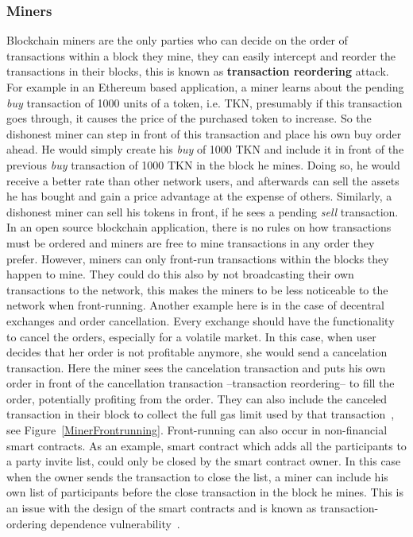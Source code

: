 \subsubsection{Miners}
Blockchain miners are the only parties who can decide on the order of transactions within a block they mine, they can easily intercept and reorder the transactions in their blocks, this is known as \textbf{transaction reordering} attack.  For example in an Ethereum based application, a miner learns about the pending \textit{buy} transaction of 1000 units of a token, i.e. TKN, presumably if this transaction goes through, it causes the price of the purchased token to increase. So the dishonest miner can step in front of this transaction and place his own buy order ahead. He would simply create his \textit{buy} of 1000 TKN and include it in front of the previous \textit{buy} transaction of 1000 TKN in the block he mines. Doing so, he would receive a better rate than other network users, and afterwards can sell the assets he has bought and gain a price advantage at the expense of others. Similarly, a dishonest miner can sell his tokens in front, if he sees a pending \textit{sell} transaction. In an open source blockchain application, there is no rules on how transactions must be ordered and miners are free to mine transactions in any order they prefer. However, miners can only front-run transactions within the blocks they happen to mine. They could do this also by not broadcasting their own transactions to the network, this makes the miners to be less noticeable to the network when front-running.
Another example here is in the case of decentral exchanges and order cancellation. Every exchange should have the functionality to cancel the orders, especially for a volatile market. In this case, when user decides that her order is not profitable anymore, she would send a cancelation transaction. Here the miner sees the cancelation transaction and puts his own order in front of the cancellation transaction --transaction reordering-- to fill the order, potentially profiting from the order. They can also include the canceled transaction in their block to collect the full gas limit used by that transaction~\cite{CostofDecentralization:online}, see Figure~\ref{MinerFrontrunning}. Front-running can also occur in non-financial smart contracts. As an example, smart contract which adds all the participants to a party invite list, could only be closed by the smart contract owner. In this case when the owner sends the transaction to close the list, a miner can include his own list of participants before the close transaction in the block he mines. This is an issue with the design of the smart contracts and is known as transaction-ordering dependence vulnerability~\cite{luu2016making}. 

